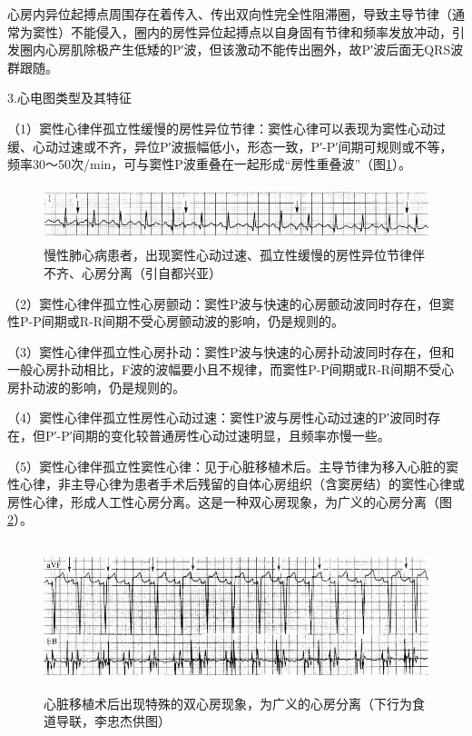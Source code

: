 心房内异位起搏点周围存在着传入、传出双向性完全性阻滞圈，导致主导节律（通常为窦性）不能侵入，圈内的房性异位起搏点以自身固有节律和频率发放冲动，引发圈内心房肌除极产生低矮的P′波，但该激动不能传出圈外，故P′波后面无QRS波群跟随。

3.心电图类型及其特征

（1）窦性心律伴孤立性缓慢的房性异位节律：窦性心律可以表现为窦性心动过缓、心动过速或不齐，异位P′波振幅低小，形态一致，P′-P′间期可规则或不等，频率30～50次/min，可与窦性P波重叠在一起形成“房性重叠波”（图\ref{fig19-11}）。

\begin{figure}[!htbp]
 \centering
 \includegraphics[width=5.58333in,height=0.64583in]{./images/Image00327.jpg}
 \captionsetup{justification=centering}
 \caption{慢性肺心病患者，出现窦性心动过速、孤立性缓慢的房性异位节律伴不齐、心房分离（引自都兴亚）}
 \label{fig19-11}
  \end{figure} 

（2）窦性心律伴孤立性心房颤动：窦性P波与快速的心房颤动波同时存在，但窦性P-P间期或R-R间期不受心房颤动波的影响，仍是规则的。

（3）窦性心律伴孤立性心房扑动：窦性P波与快速的心房扑动波同时存在，但和一般心房扑动相比，F波的波幅要小且不规律，而窦性P-P间期或R-R间期不受心房扑动波的影响，仍是规则的。

（4）窦性心律伴孤立性房性心动过速：窦性P波与房性心动过速的P′波同时存在，但P′-P′间期的变化较普通房性心动过速明显，且频率亦慢一些。

（5）窦性心律伴孤立性窦性心律：见于心脏移植术后。主导节律为移入心脏的窦性心律，非主导心律为患者手术后残留的自体心房组织（含窦房结）的窦性心律或房性心律，形成人工性心房分离。这是一种双心房现象，为广义的心房分离（图\ref{fig19-12}）。

\begin{figure}[!htbp]
 \centering
 \includegraphics[width=5.58333in,height=1.70833in]{./images/Image00328.jpg}
 \captionsetup{justification=centering}
 \caption{心脏移植术后出现特殊的双心房现象，为广义的心房分离（下行为食道导联，李忠杰供图）}
 \label{fig19-12}
  \end{figure} 

